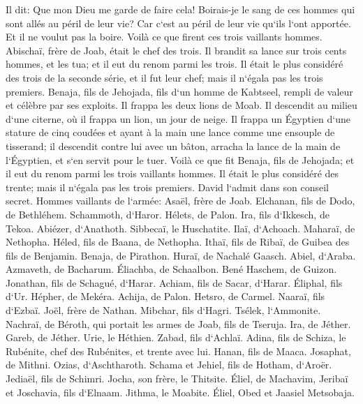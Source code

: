 \verse Il dit: Que mon Dieu me garde de faire cela! Boirais-je le sang de ces hommes qui sont allés au péril de leur vie? Car c`est au péril de leur vie qu`ils l`ont apportée. Et il ne voulut pas la boire. Voilà ce que firent ces trois vaillants hommes. 
\verse Abischaï, frère de Joab, était le chef des trois. Il brandit sa lance sur trois cents hommes, et les tua; et il eut du renom parmi les trois. 
\verse Il était le plus considéré des trois de la seconde série, et il fut leur chef; mais il n`égala pas les trois premiers. 
\verse Benaja, fils de Jehojada, fils d`un homme de Kabtseel, rempli de valeur et célèbre par ses exploits. Il frappa les deux lions de Moab. Il descendit au milieu d`une citerne, où il frappa un lion, un jour de neige. 
\verse Il frappa un Égyptien d`une stature de cinq coudées et ayant à la main une lance comme une ensouple de tisserand; il descendit contre lui avec un bâton, arracha la lance de la main de l`Égyptien, et s`en servit pour le tuer. 
\verse Voilà ce que fit Benaja, fils de Jehojada; et il eut du renom parmi les trois vaillants hommes. 
\verse Il était le plus considéré des trente; mais il n`égala pas les trois premiers. David l`admit dans son conseil secret. 
\verse Hommes vaillants de l`armée: Asaël, frère de Joab. Elchanan, fils de Dodo, de Bethléhem. 
\verse Schammoth, d`Haror. Hélets, de Palon. 
\verse Ira, fils d`Ikkesch, de Tekoa. Abiézer, d`Anathoth. 
\verse Sibbecaï, le Huschatite. Ilaï, d`Achoach. 
\verse Maharaï, de Nethopha. Héled, fils de Baana, de Nethopha. 
\verse Ithaï, fils de Ribaï, de Guibea des fils de Benjamin. Benaja, de Pirathon. 
\verse Huraï, de Nachalé Gaasch. Abiel, d`Araba. 
\verse Azmaveth, de Bacharum. Éliachba, de Schaalbon. 
\verse Bené Haschem, de Guizon. Jonathan, fils de Schagué, d`Harar. 
\verse Achiam, fils de Sacar, d`Harar. Éliphal, fils d`Ur. 
\verse Hépher, de Mekéra. Achija, de Palon. 
\verse Hetsro, de Carmel. Naaraï, fils d`Ezbaï. 
\verse Joël, frère de Nathan. Mibchar, fils d`Hagri. 
\verse Tsélek, l`Ammonite. Nachraï, de Béroth, qui portait les armes de Joab, fils de Tseruja. 
\verse Ira, de Jéther. Gareb, de Jéther. 
\verse Urie, le Héthien. Zabad, fils d`Achlaï. 
\verse Adina, fils de Schiza, le Rubénite, chef des Rubénites, et trente avec lui. 
\verse Hanan, fils de Maaca. Josaphat, de Mithni. 
\verse Ozias, d`Aschtharoth. Schama et Jehiel, fils de Hotham, d`Aroër. 
\verse Jediaël, fils de Schimri. Jocha, son frère, le Thitsite. 
\verse Éliel, de Machavim, Jeribaï et Joschavia, fils d`Elnaam. Jithma, le Moabite. 
\verse Éliel, Obed et Jaasiel Metsobaja. 


